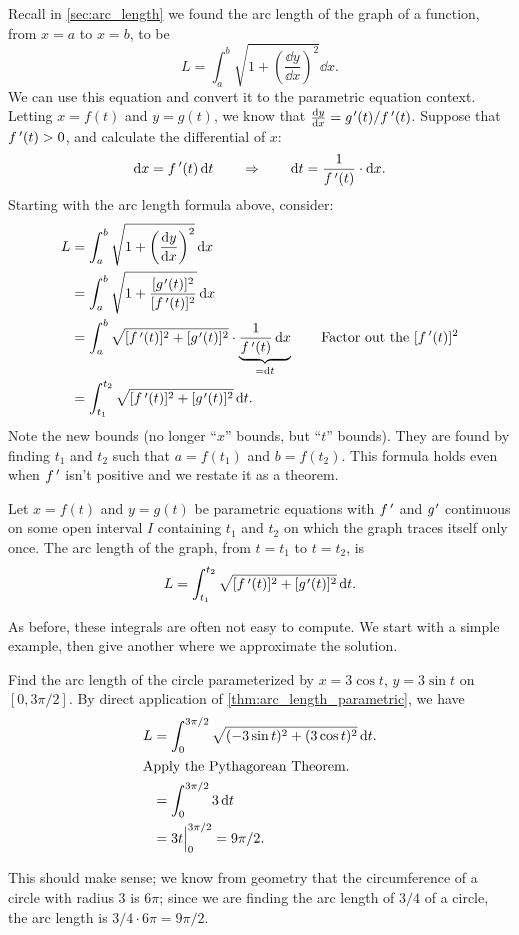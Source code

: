 Recall in \autoref{sec:arc_length} we found the arc length of the graph of a function, from $x=a$ to $x=b$, to be
\[L = \int_a^b\sqrt{1+\left(\frac{\dd y}{\dd x}\right)^2}\dd x.\]
We can use this equation and convert it to the parametric equation context. Letting $x=f(t)$ and $y=g(t)$, we know that $\frac{\dd y}{\dd x} = g\primeskip'(t)/\fp(t)$. Suppose that $f\,'(t)>0$, and calculate the differential of $x$:
\[\operatorname{d}\! x = f\,'(t)\operatorname{d}\! t \qquad \Rightarrow \qquad \operatorname{d}\! t = \frac{1}{f\,'(t)}\cdot \operatorname{d}\! x.\]
Starting with the arc length formula above, consider:
\begin{align*}
	L &= \int_a^b\sqrt{1+\left(\frac{\dd y}{\dd x}\right)^2}\dd x\\
	&= \int_a^b \sqrt{1+\frac{[g\primeskip'(t)]^2}{[\fp(t)]^2}}\dd x \\
	&= \int_a^b \sqrt{[\fp(t)]^2+[g\primeskip'(t)]^2}\cdot\underbrace{\frac1{\fp(t)}\dd x}_{=\dd t} \qquad\text{Factor out the $[\fp(t)]^2$} \\
	&= \int_{t_1}^{t_2} \sqrt{[\fp(t)]^2+[g\primeskip'(t)]^2}\dd t.\\
\end{align*}
Note the new bounds (no longer ``$x$'' bounds, but ``$t$'' bounds). They are found by finding $t_1$ and $t_2$ such that $a= f(t_1)$ and $b=f(t_2)$. This formula holds even when $f\,'$ isn't positive and we restate it as a theorem.

\begin{theorem}\label{thm:arc_length_parametric}%
Let $x=f(t)$ and $y=g(t)$ be parametric equations with $f\,'$ and $g\primeskip'$ continuous on some open interval $I$ containing $t_1$ and $t_2$ on which the graph traces itself only once. The arc length of the graph, from $t=t_1$ to $t=t_2$, is
\[L = \int_{t_1}^{t_2} \sqrt{[\fp(t)]^2+[g\primeskip'(t)]^2}\dd t.\]
\end{theorem}

As before, these integrals are often not easy to compute. We start with a simple example, then give  another where we approximate the solution.

\begin{example}\label{ex_parcalc6}%
Find the arc length of the circle parameterized by $x=3\cos t$, $y=3\sin t$ on $[0,3\pi/2]$. 
\solution
By direct application of \autoref{thm:arc_length_parametric}, we have
\begin{align*}
L &= \int_0^{3\pi/2} \sqrt{(-3\sin t)^2 +(3\cos t)^2} \operatorname{d}\! t.\\
\intertext{Apply the Pythagorean Theorem.}
	&= \int_0^{3\pi/2} 3 \operatorname{d}\! t\\
	&= 3t\Big|_0^{3\pi/2} = 9\pi/2.
	\end{align*}
	
This should make sense; we know from geometry that the circumference of a circle with radius 3 is $6\pi$; since we are finding the arc length of $3/4$ of a circle, the arc length is $3/4\cdot 6\pi = 9\pi/2$.
\end{example}

